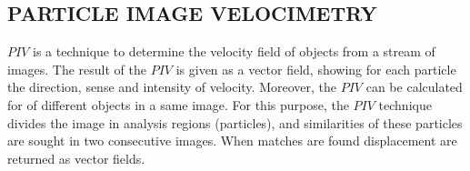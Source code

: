 
\subsection{PARTICLE IMAGE VELOCIMETRY}

$PIV$ is a technique to determine the  velocity field of objects from a stream of images\cite{Bastiaans}.
The result of the $PIV$ is given as a vector field, showing for each particle the direction, sense and intensity of velocity. 
Moreover, the $PIV$ can be calculated for of different objects in a same image.
For this purpose, the $PIV$ technique divides the image in analysis regions (particles), 
and similarities of these particles are sought in two consecutive images.
When matches are found displacement are returned as vector fields.